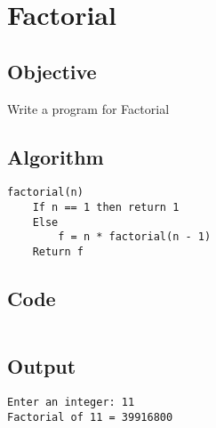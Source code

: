 \section{Factorial}
\label{sec:Factorial}

\subsection{Objective}
Write a program for Factorial

\subsection{Algorithm}
\begin{lstlisting}[style=mystyle]
factorial(n)
    If n == 1 then return 1
    Else 
        f = n * factorial(n - 1)
    Return f
\end{lstlisting}

\subsection{Code}
\inputminted[]{c}{../../Code/factorial.c}

\subsection{Output}
\begin{lstlisting}[style=output]
Enter an integer: 11
Factorial of 11 = 39916800
\end{lstlisting}

\pagebreak
